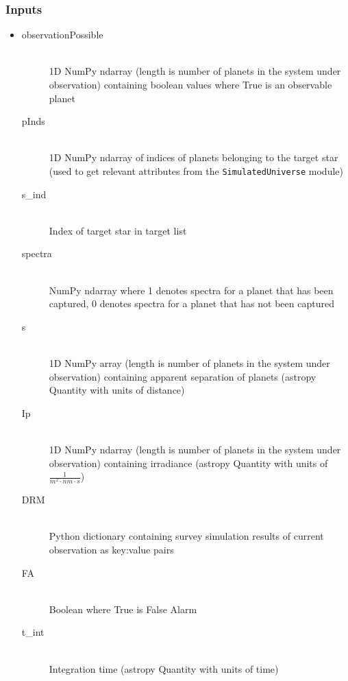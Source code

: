 \documentclass[cleanfoot]{asme2ej}
\begin{document}
\subsubsection*{Inputs}
\begin{itemize}
    \item 
    \begin{description}
        \item[observationPossible] \hfill \\
        1D NumPy ndarray (length is number of planets in the system under observation) containing boolean values where True is an observable planet
        \item[pInds] \hfill \\
        1D NumPy ndarray of indices of planets belonging to the target star (used to get relevant attributes from the \verb+SimulatedUniverse+ module)
        \item[s\_ind] \hfill \\
        Index of target star in target list
        \item[spectra] \hfill \\
        NumPy ndarray where 1 denotes spectra for a planet that has been captured, 0 denotes spectra for a planet that has not been captured
        \item[s] \hfill \\
        1D NumPy array (length is number of planets in the system under observation) containing apparent separation of planets (astropy Quantity with units of distance)
        \item[Ip] \hfill \\
        1D NumPy ndarray (length is number of planets in the system under observation) containing irradiance (astropy Quantity with units of $ \frac{1}{m^2 \cdot nm \cdot s} $)
        \item[DRM] \hfill \\
        Python dictionary containing survey simulation results of current observation as key:value pairs
        \item[FA] \hfill \\
        Boolean where True is False Alarm
        \item[t\_int] \hfill \\
        Integration time (astropy Quantity with units of time)
    \end{description}
\end{itemize}
\end{document}
